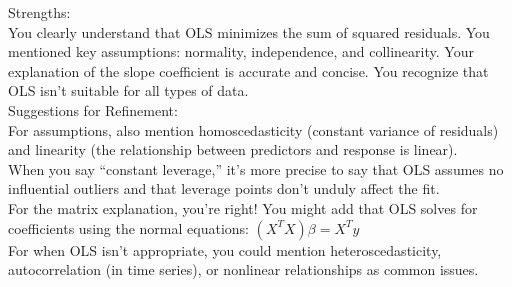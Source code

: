 \documentclass{article}\usepackage[]{graphicx}\usepackage[]{xcolor}
\begin{document}
\begin{enumerate}
\begin{tcolorbox}[breakable]
Strengths: \\

You clearly understand that OLS minimizes the sum of squared residuals.
You mentioned key assumptions: normality, independence, and collinearity.
Your explanation of the slope coefficient is accurate and concise.
You recognize that OLS isn’t suitable for all types of data. \\

Suggestions for Refinement: \\

For assumptions, also mention homoscedasticity (constant variance of residuals) and linearity (the relationship between predictors and response is linear). \\

When you say “constant leverage,” it’s more precise to say that OLS assumes no influential outliers and that leverage points don’t unduly affect the fit. \\

For the matrix explanation, you’re right! You might add that OLS solves for coefficients using the normal equations: $(X^{T}X)\beta = X^{T}y$ \\

For when OLS isn’t appropriate, you could mention heteroscedasticity, autocorrelation (in time series), or nonlinear relationships as common issues. \\


\end{tcolorbox}
\end{enumerate}
\end{document}
